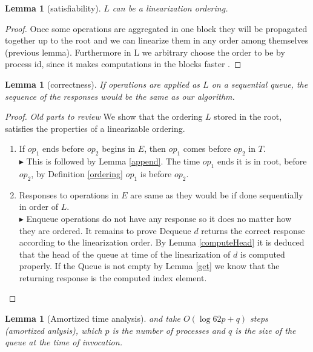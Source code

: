 \documentclass[10pt]{article}
\renewcommand{\it}[1]{\textit{#1}}
\newcommand{\nf}[1]{{\normalfont{\texttt{#1}}}}
\newcommand{\size}{size}
\newtheorem{lemma}[theorem]{Lemma}
\theoremstyle{definition}
\begin{document}
\begin{lemma}[satisfiability]
$L$ can be a linearization ordering.
\end{lemma}
\begin{proof}
Once some operations are aggregated in one block they will be propagated together up to the root and we can linearize them in any order among themselves (previous lemma). Furthermore in L we arbitrary choose the order to be by process id, since it makes computations in  the blocks faster .
\end{proof}

\begin{lemma}[correctness]
  If operations are applied as $L$ on a sequential queue, the sequence of the responses would be the same as our algorithm.
\end{lemma}

\begin{proof}
\it{Old parts to review}
  We show that the ordering $L$ stored in the root, satisfies the properties of a linearizable ordering.
  \begin{enumerate}
    \item If $op_1$ ends before $op_2$ begins in $E$, then $op_1$ comes before $op_2$ in $T$.\\$\blacktriangleright$ This is followed by Lemma \ref{append}. The time $op_1$ ends it is in root, before $op_2$, by Definition \ref{ordering} $op_1$ is before $op_2$.
    \item Responses to operations in $E$ are same as they would be if done sequentially in order of $L$. \\$\blacktriangleright$ Enqueue operations do not have any response so it does no matter how they are ordered. It remains to prove  Dequeue $d$ returns the correct response according to the linearization order. By Lemma \ref{computeHead} it is deduced that the head of the queue at time of the linearization of $d$ is computed properly. If the Queue is not empty by Lemma \ref{get} we know that the returning response is the computed index element.
  \end{enumerate} 
\end{proof}

\pagebreak


\begin{lemma}[Amortized time analysis]
\nf{Enqueue()} and \nf{Dequeue} take $O(\log62 p +q)$ steps (amortized anlysis), which $p$ is the number of processes and $q$ is the size of the queue at the time of invocation.
\end{lemma}

\end{document}
